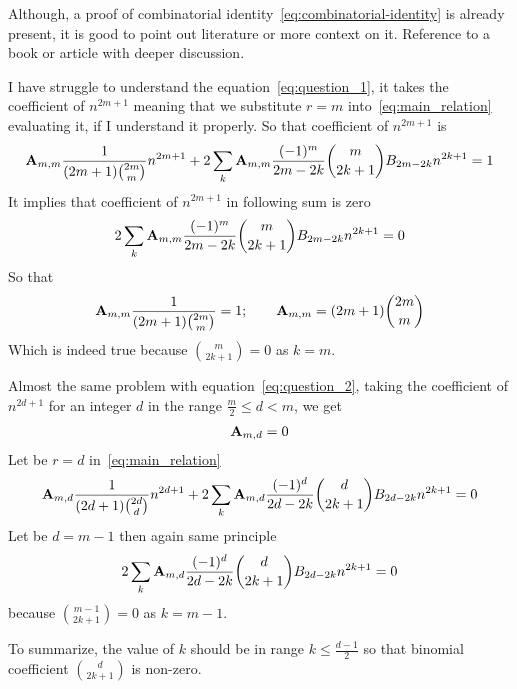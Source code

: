 ﻿\begin{question}
    Although, a proof of combinatorial identity~\eqref{eq:combinatorial-identity} is already present, it is good
    to point out literature or more context on it.
    Reference to a book or article with deeper discussion.
\end{question}
\begin{question}
    I have struggle to understand the equation~\eqref{eq:question_1}, it takes the coefficient of $n^{2m+1}$ meaning that
    we substitute $r=m$ into~\eqref{eq:main_relation} evaluating it, if I understand it properly.
    So that coefficient of $n^{2m+1}$ is
    \begin{align*}
         {\mathbf{A}} \sb{m,m} \frac{1}{(2m+1) \binom{2m}m} n^{2m+1}
        + 2 \sum_{k} {\mathbf{A}} \sb{m,m} \frac{(-1)^m}{2m-2k} \binom{m}{2k+1} {B}\sb{2m-2k} n^{2k+1} = 1
    \end{align*}
    It implies that coefficient of $n^{2m+1}$ in following sum is zero
    \begin{align*}
        2 \sum_{k} {\mathbf{A}} \sb{m,m} \frac{(-1)^m}{2m-2k} \binom{m}{2k+1} {B}\sb{2m-2k} n^{2k+1} = 0
    \end{align*}
    So that
    \begin{align*}
        {\mathbf{A}} \sb{m,m} \frac{1}{(2m+1) \binom{2m}m} = 1; \quad \quad {\mathbf{A}} \sb{m,m} = (2m+1)\binom{2m}{m}
    \end{align*}
    Which is indeed true because $\binom{m}{2k+1} = 0$ as $k=m$.
\end{question}
\begin{question}
    Almost the same problem with equation~\eqref{eq:question_2},
    taking the coefficient of $n^{2d+1}$ for an integer $d$ in the range $\frac{m}{2} \leq d < m$, we get
    \begin{align*}
        {\mathbf{A}} \sb{m,d} = 0
    \end{align*}
    Let be $r=d$ in~\eqref{eq:main_relation}
    \begin{align*}
        {\mathbf{A}} \sb{m,d} \frac{1}{(2d+1) \binom{2d}d} n^{2d+1}
        + 2 \sum_{k} {\mathbf{A}} \sb{m,d} \frac{(-1)^d}{2d-2k} \binom{d}{2k+1} {B}\sb{2d-2k} n^{2k+1} = 0
    \end{align*}
    Let be $d=m-1$ then again same principle
    \begin{align*}
        2 \sum_{k} {\mathbf{A}} \sb{m,d} \frac{(-1)^d}{2d-2k} \binom{d}{2k+1} {B}\sb{2d-2k} n^{2k+1} = 0
    \end{align*}
    because $\binom{m-1}{2k+1}=0$ as $k=m-1$.
\end{question}
To summarize, the value of $k$ should be in range $k \leq \frac{d-1}{2}$ so that binomial coefficient $\binom{d}{2k+1}$
is non-zero.
